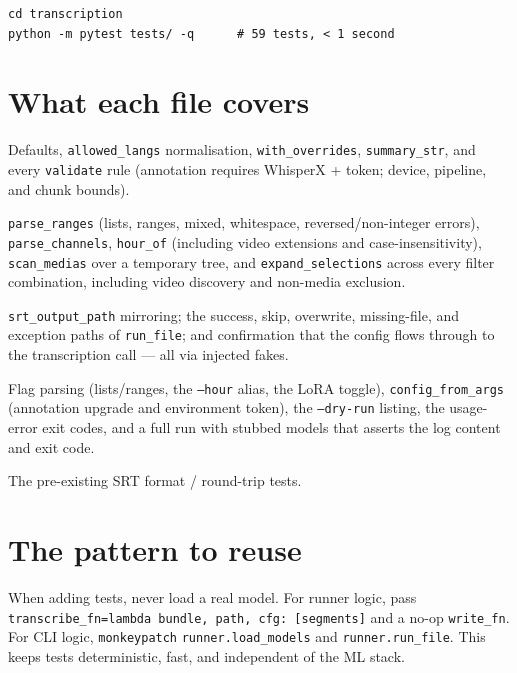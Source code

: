 \documentclass[11pt,a4paper]{report}
\newcommand{\code}[1]{\texttt{\small #1}}
\begin{document}
\begin{lstlisting}[style=sh,numbers=none,caption={Running the tests.}]
cd transcription
python -m pytest tests/ -q      # 59 tests, < 1 second
\end{lstlisting}

\section{What each file covers}

\begin{description}[leftmargin=2em,style=nextline]
  \item[\texttt{test\_config.py}] Defaults, \code{allowed\_langs} normalisation,
        \code{with\_overrides}, \code{summary\_str}, and every \code{validate}
        rule (annotation requires WhisperX + token; device, pipeline, and chunk
        bounds).
  \item[\texttt{test\_selection.py}] \code{parse\_ranges} (lists, ranges, mixed,
        whitespace, reversed/non-integer errors), \code{parse\_channels},
        \code{hour\_of} (including video extensions and case-insensitivity),
        \code{scan\_medias} over a temporary tree, and \code{expand\_selections}
        across every filter combination, including video discovery and non-media
        exclusion.
  \item[\texttt{test\_runner.py}] \code{srt\_output\_path} mirroring;
        the success, skip, overwrite, missing-file, and exception paths of
        \code{run\_file}; and confirmation that the config flows through to the
        transcription call --- all via injected fakes.
  \item[\texttt{test\_cli.py}] Flag parsing (lists/ranges, the \code{--hour}
        alias, the LoRA toggle), \code{config\_from\_args} (annotation upgrade and
        environment token), the \code{--dry-run} listing, the usage-error exit
        codes, and a full run with stubbed models that asserts the log content and
        exit code.
  \item[\texttt{test\_srt\_writer.py}] The pre-existing SRT format / round-trip
        tests.
\end{description}

\section{The pattern to reuse}

When adding tests, never load a real model. For runner logic, pass
\code{transcribe\_fn=lambda bundle, path, cfg: [segments]} and a no-op
\code{write\_fn}. For CLI logic, \code{monkeypatch} \code{runner.load\_models} and
\code{runner.run\_file}. This keeps tests deterministic, fast, and independent of
the ML stack.
\end{document}
